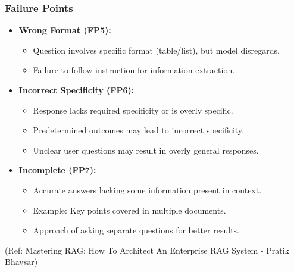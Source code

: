\begin{frame}[fragile]\frametitle{Failure Points}
\begin{itemize}
  
  \item \textbf{Wrong Format (FP5):}
    \begin{itemize}
        \item Question involves specific format (table/list), but model disregards.
        \item Failure to follow instruction for information extraction.
    \end{itemize}
  
  \item \textbf{Incorrect Specificity (FP6):}
    \begin{itemize}
        \item Response lacks required specificity or is overly specific.
        \item Predetermined outcomes may lead to incorrect specificity.
        \item Unclear user questions may result in overly general responses.
    \end{itemize}
  
  \item \textbf{Incomplete (FP7):}
    \begin{itemize}
        \item Accurate answers lacking some information present in context.
        \item Example: Key points covered in multiple documents.
        \item Approach of asking separate questions for better results.
    \end{itemize}
\end{itemize}

{\tiny (Ref: Mastering RAG: How To Architect An Enterprise RAG System - Pratik Bhavsar)}

\end{frame}






